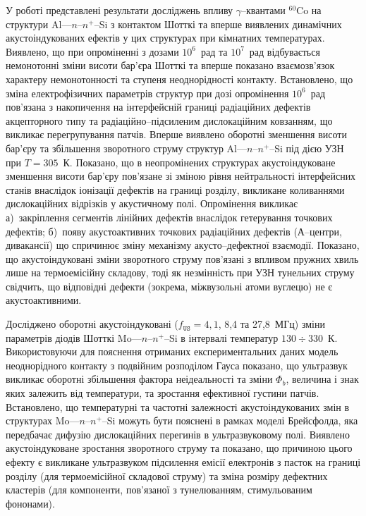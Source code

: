 У  роботі представлені результати досліджень
впливу $\gamma$--квантами $^{60}$Co на структури Al---$n$--$n^+$--Si з контактом Шотткі та
вперше виявлених динамічних акустоіндукованих ефектів у цих структурах при кімнатних температурах.
Виявлено, що при
опроміненні  з дозами $10^6$~рад та $10^7$~рад відбувається
немонотонні зміни висоти бар'єра Шотткі та вперше показано взаємозв'язок характеру немонотонності та ступеня неоднорідності контакту.
Встановлено, що зміна електрофізичних параметрів структур при дозі опромінення $10^6$~рад
пов'язана з накопичення на інтерфейсній границі радіаційних дефектів акцепторного типу та радіаційно--підсиленим дислокаційним ковзанням, що викликає перегрупування патчів.
Вперше виявлено оборотні зменшення висоти бар'єру та збільшення зворотного струму  структур Al---$n$--$n^+$--Si під дією УЗН при $T=305$~К.
Показано, що в неопромінених структурах акустоіндуковане зменшення висоти бар'єру пов'язане зі зміною рівня нейтральності інтерфейсних станів
внаслідок іонізації дефектів на границі розділу, викликане коливаннями дислокаційних відрізків у акустичному полі.
Опромінення викликає
а)~закріплення сегментів лінійних дефектів внаслідок гетерування точкових дефектів;
б)~появу акустоактивних точкових радіаційних дефектів (А--центри, дивакансії)
що спричинює зміну механізму акусто--дефектної взаємодії.
Показано, що акустоіндуковані зміни зворотного струму пов'язані з впливом пружних хвиль лише на термоемісійну складову,
тоді як незмінність при УЗН тунельних струму свідчить, що відповідні дефекти (зокрема, міжвузольні атоми вуглецю) не є акустоактивними.


Досліджено оборотні акустоіндуковані ($f_\mathtt{US}=4,1$, 8,4 та 27,8~МГц) зміни параметрів діодів Шотткі Mo---$n$--$n^+$--Si в інтервалі температур $130\div330$~К.
Використовуючи для пояснення отриманих експериментальних даних модель неоднорідного контакту з подвійним розподілом Гауса
показано, що ультразвук викликає оборотні збільшення фактора неідеальності та зміни $\Phi_{b}$,
величина і знак яких залежить від температури,
та зростання ефективної густини патчів.
Встановлено, що температурні та частотні залежності акустоіндукованих змін в структурах
 Mo---$n$--$n^+$--Si  можуть бути пояснені в рамках моделі Брейсфолда,
яка передбачає дифузію дислокаційних перегинів в ультразвуковому полі.
Виявлено акустоіндуковане зростання зворотного струму та показано, що причиною цього ефекту є викликане ультразвуком підсилення емісії електронів з пасток на границі розділу (для термоемісійної складової струму) та зміна розміру дефектних кластерів (для компоненти, пов'язаної з тунелюванням, стимульованим фононами).

